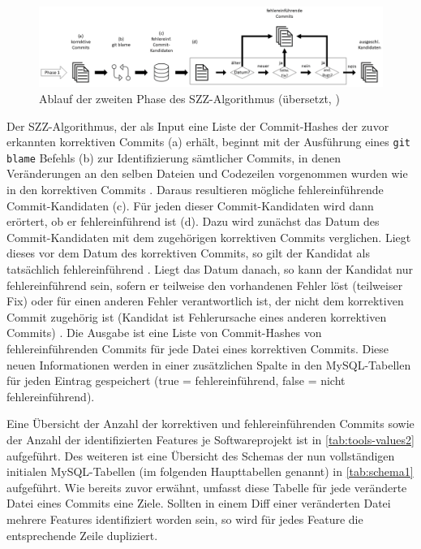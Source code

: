 \begin{figure}[H]
    \centering
    \includegraphics[width=\textwidth]{images/SZZ}
    \caption{Ablauf der zweiten Phase des SZZ-Algorithmus (übersetzt, \cite{Borg2019})\label{fig:szz}}
\end{figure}

Der SZZ-Algorithmus, der als Input eine Liste der Commit-Hashes der zuvor erkannten korrektiven Commits (a) erhält, beginnt mit der Ausführung eines \texttt{git blame} Befehls (b) zur Identifizierung sämtlicher Commits, in denen Veränderungen an den selben Dateien und Codezeilen vorgenommen wurden wie in den korrektiven Commits \cite{Borg2019}. Daraus resultieren mögliche fehlereinführende Commit-Kandidaten (c). Für jeden dieser Commit-Kandidaten wird dann erörtert, ob er fehlereinführend ist (d). Dazu wird zunächst das Datum des Commit-Kandidaten mit dem zugehörigen korrektiven Commits verglichen. Liegt dieses vor dem Datum des korrektiven Commits, so gilt der Kandidat als tatsächlich fehlereinführend \cite{Borg2019}. Liegt das Datum danach, so kann der Kandidat nur fehlereinführend sein, sofern er teilweise den vorhandenen Fehler löst (teilweiser Fix) oder für einen anderen Fehler verantwortlich ist, der nicht dem korrektiven Commit zugehörig ist (Kandidat ist Fehlerursache eines anderen korrektiven Commits) \cite{Borg2019}. Die Ausgabe ist eine Liste von Commit-Hashes von fehlereinführenden Commits für jede Datei eines korrektiven Commits. Diese neuen Informationen werden in einer zusätzlichen Spalte in den MySQL-Tabellen für jeden Eintrag gespeichert (true = fehlereinführend, false = nicht fehlereinführend). 

Eine Übersicht der Anzahl der korrektiven und fehlereinführenden Commits sowie der Anzahl der identifizierten Features je Softwareprojekt ist in \autoref{tab:tools-values2} aufgeführt. Des weiteren ist eine Übersicht des Schemas der nun vollständigen initialen MySQL-Tabellen (im folgenden Haupttabellen genannt) in \autoref{tab:schema1} aufgeführt. Wie bereits zuvor erwähnt, umfasst diese Tabelle für jede veränderte Datei eines Commits eine Ziele. Sollten in einem Diff einer veränderten Datei mehrere Features identifiziert worden sein, so wird für jedes Feature die entsprechende Zeile dupliziert.

